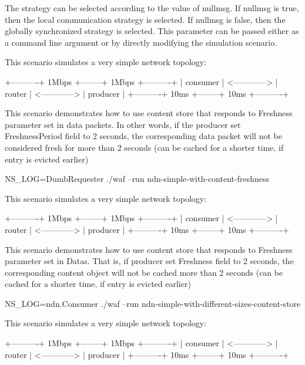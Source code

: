 The strategy can be selected according to the value of nullmsg. If nullmsg is true, then the local communication strategy is selected. If nullmsg is false, then the globally synchronized strategy is selected. This parameter can be passed either as a command line argument or by directly modifying the simulation scenario.

This scenario simulates a very simple network topology\+:

\begin{DoxyVerb} +----------+     1Mbps      +--------+     1Mbps      +----------+
 | consumer | <------------> | router | <------------> | producer |
 +----------+         10ms   +--------+          10ms  +----------+
\end{DoxyVerb}


This scenario demonstrates how to use content store that responds to Freshness parameter set in data packets. In other words, if the producer set Freshness\+Period field to 2 seconds, the corresponding data packet will not be considered fresh for more than 2 seconds (can be cached for a shorter time, if entry is evicted earlier) \begin{DoxyVerb}NS_LOG=DumbRequester ./waf --run ndn-simple-with-content-freshness\end{DoxyVerb}


This scenario simulates a very simple network topology\+:

\begin{DoxyVerb}  +----------+     1Mbps      +--------+     1Mbps      +----------+
  | consumer | <------------> | router | <------------> | producer |
  +----------+         10ms   +--------+          10ms  +----------+
\end{DoxyVerb}


This scenario demonstrates how to use content store that responds to Freshness parameter set in Datas. That is, if producer set Freshness field to 2 seconds, the corresponding content object will not be cached more than 2 seconds (can be cached for a shorter time, if entry is evicted earlier) \begin{DoxyVerb}NS_LOG=ndn.Consumer ./waf --run ndn-simple-with-different-sizes-content-store\end{DoxyVerb}


This scenario simulates a very simple network topology\+:

\begin{DoxyVerb} +----------+     1Mbps      +--------+     1Mbps      +----------+
 | consumer | <------------> | router | <------------> | producer |
 +----------+         10ms   +--------+          10ms  +----------+
\end{DoxyVerb}


